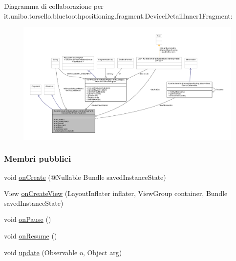 Diagramma di collaborazione per it.\+unibo.\+torsello.\+bluetoothpositioning.\+fragment.\+Device\+Detail\+Inner1\+Fragment\+:
\nopagebreak
\begin{figure}[H]
\begin{center}
\leavevmode
\includegraphics[width=350pt]{classit_1_1unibo_1_1torsello_1_1bluetoothpositioning_1_1fragment_1_1DeviceDetailInner1Fragment__coll__graph}
\end{center}
\end{figure}
\subsubsection*{Membri pubblici}
\begin{DoxyCompactItemize}
\item 
void \hyperlink{classit_1_1unibo_1_1torsello_1_1bluetoothpositioning_1_1fragment_1_1DeviceDetailInner1Fragment_aaa8488de9fd9d2664615301e0f0d15b7_aaa8488de9fd9d2664615301e0f0d15b7}{on\+Create} (@Nullable Bundle saved\+Instance\+State)
\item 
View \hyperlink{classit_1_1unibo_1_1torsello_1_1bluetoothpositioning_1_1fragment_1_1DeviceDetailInner1Fragment_ae5c81b4c40cb3a4d4efda932434bbb7c_ae5c81b4c40cb3a4d4efda932434bbb7c}{on\+Create\+View} (Layout\+Inflater inflater, View\+Group container, Bundle saved\+Instance\+State)
\item 
void \hyperlink{classit_1_1unibo_1_1torsello_1_1bluetoothpositioning_1_1fragment_1_1DeviceDetailInner1Fragment_a7579453e29121da309ed08d902be67b9_a7579453e29121da309ed08d902be67b9}{on\+Pause} ()
\item 
void \hyperlink{classit_1_1unibo_1_1torsello_1_1bluetoothpositioning_1_1fragment_1_1DeviceDetailInner1Fragment_ae54c5f54c5c3fde90927916d41bc284e_ae54c5f54c5c3fde90927916d41bc284e}{on\+Resume} ()
\item 
void \hyperlink{classit_1_1unibo_1_1torsello_1_1bluetoothpositioning_1_1fragment_1_1DeviceDetailInner1Fragment_ad64b7a4bff76d27a4fef8d14760e347b_ad64b7a4bff76d27a4fef8d14760e347b}{update} (Observable o, Object arg)
\end{DoxyCompactItemize}
